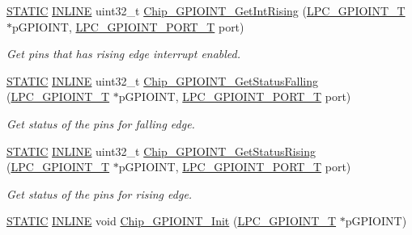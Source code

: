 \begin{DoxyCompactItemize}
\hyperlink{group__LPC__Types__Public__Macros_ga10b2d890d871e1489bb02b7e70d9bdfb}{S\+T\+A\+T\+IC} \hyperlink{group__LPC__Types__Public__Types_ga2eb6f9e0395b47b8d5e3eeae4fe0c116}{I\+N\+L\+I\+NE} uint32\+\_\+t \hyperlink{group__GPIOINT__17XX__40XX_ga087f70143b825e771bf9acb2d21794bf}{Chip\+\_\+\+G\+P\+I\+O\+I\+N\+T\+\_\+\+Get\+Int\+Rising} (\hyperlink{structLPC__GPIOINT__T}{L\+P\+C\+\_\+\+G\+P\+I\+O\+I\+N\+T\+\_\+T} $\ast$p\+G\+P\+I\+O\+I\+NT, \hyperlink{group__GPIOINT__17XX__40XX_ga41631ac5e33fde341c0afe680ded9fee}{L\+P\+C\+\_\+\+G\+P\+I\+O\+I\+N\+T\+\_\+\+P\+O\+R\+T\+\_\+T} port)
\begin{DoxyCompactList}\small\item\em Get pins that has rising edge interrupt enabled. \end{DoxyCompactList}\item 
\hyperlink{group__LPC__Types__Public__Macros_ga10b2d890d871e1489bb02b7e70d9bdfb}{S\+T\+A\+T\+IC} \hyperlink{group__LPC__Types__Public__Types_ga2eb6f9e0395b47b8d5e3eeae4fe0c116}{I\+N\+L\+I\+NE} uint32\+\_\+t \hyperlink{group__GPIOINT__17XX__40XX_gaa70fc03d17d6dd929249e435dcfb777b}{Chip\+\_\+\+G\+P\+I\+O\+I\+N\+T\+\_\+\+Get\+Status\+Falling} (\hyperlink{structLPC__GPIOINT__T}{L\+P\+C\+\_\+\+G\+P\+I\+O\+I\+N\+T\+\_\+T} $\ast$p\+G\+P\+I\+O\+I\+NT, \hyperlink{group__GPIOINT__17XX__40XX_ga41631ac5e33fde341c0afe680ded9fee}{L\+P\+C\+\_\+\+G\+P\+I\+O\+I\+N\+T\+\_\+\+P\+O\+R\+T\+\_\+T} port)
\begin{DoxyCompactList}\small\item\em Get status of the pins for falling edge. \end{DoxyCompactList}\item 
\hyperlink{group__LPC__Types__Public__Macros_ga10b2d890d871e1489bb02b7e70d9bdfb}{S\+T\+A\+T\+IC} \hyperlink{group__LPC__Types__Public__Types_ga2eb6f9e0395b47b8d5e3eeae4fe0c116}{I\+N\+L\+I\+NE} uint32\+\_\+t \hyperlink{group__GPIOINT__17XX__40XX_gad12bd25757ab3f58843afdb178548ef6}{Chip\+\_\+\+G\+P\+I\+O\+I\+N\+T\+\_\+\+Get\+Status\+Rising} (\hyperlink{structLPC__GPIOINT__T}{L\+P\+C\+\_\+\+G\+P\+I\+O\+I\+N\+T\+\_\+T} $\ast$p\+G\+P\+I\+O\+I\+NT, \hyperlink{group__GPIOINT__17XX__40XX_ga41631ac5e33fde341c0afe680ded9fee}{L\+P\+C\+\_\+\+G\+P\+I\+O\+I\+N\+T\+\_\+\+P\+O\+R\+T\+\_\+T} port)
\begin{DoxyCompactList}\small\item\em Get status of the pins for rising edge. \end{DoxyCompactList}\item 
\hyperlink{group__LPC__Types__Public__Macros_ga10b2d890d871e1489bb02b7e70d9bdfb}{S\+T\+A\+T\+IC} \hyperlink{group__LPC__Types__Public__Types_ga2eb6f9e0395b47b8d5e3eeae4fe0c116}{I\+N\+L\+I\+NE} void \hyperlink{group__GPIOINT__17XX__40XX_gaa35c955336ff3dc2f850f7e6cf9feee0}{Chip\+\_\+\+G\+P\+I\+O\+I\+N\+T\+\_\+\+Init} (\hyperlink{structLPC__GPIOINT__T}{L\+P\+C\+\_\+\+G\+P\+I\+O\+I\+N\+T\+\_\+T} $\ast$p\+G\+P\+I\+O\+I\+NT)

\end{DoxyCompactItemize}
